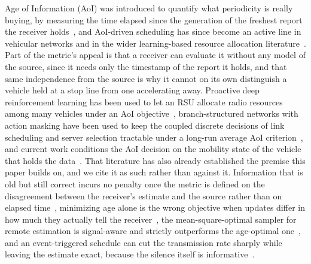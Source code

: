 \documentclass[journal]{IEEEtran}
\begin{document}
Age of Information (AoI) was introduced to quantify what periodicity is really buying, by measuring the time elapsed since the generation of the freshest report the receiver holds~\cite{kaul2012}, and AoI-driven scheduling has since become an active line in vehicular networks and in the wider learning-based resource allocation literature~\cite{kahraman2024}. Part of the metric's appeal is that a receiver can evaluate it without any model of the source, since it needs only the timestamp of the report it holds, and that same independence from the source is why it cannot on its own distinguish a vehicle held at a stop line from one accelerating away. Proactive deep reinforcement learning has been used to let an RSU allocate radio resources among many vehicles under an AoI objective~\cite{chen2020}, branch-structured networks with action masking have been used to keep the coupled discrete decisions of link scheduling and server selection tractable under a long-run average AoI criterion~\cite{xie2025}, and current work conditions the AoI decision on the mobility state of the vehicle that holds the data~\cite{tadele2026}. That literature has also already established the premise this paper builds on, and we cite it as such rather than against it. Information that is old but still correct incurs no penalty once the metric is defined on the disagreement between the receiver's estimate and the source rather than on elapsed time~\cite{maatouk2020}, minimizing age alone is the wrong objective when updates differ in how much they actually tell the receiver~\cite{rajaraman2021}, the mean-square-optimal sampler for remote estimation is signal-aware and strictly outperforms the age-optimal one~\cite{sun2020}, and an event-triggered schedule can cut the transmission rate sharply while leaving the estimate exact, because the silence itself is informative~\cite{xu2020}.
\end{document}

